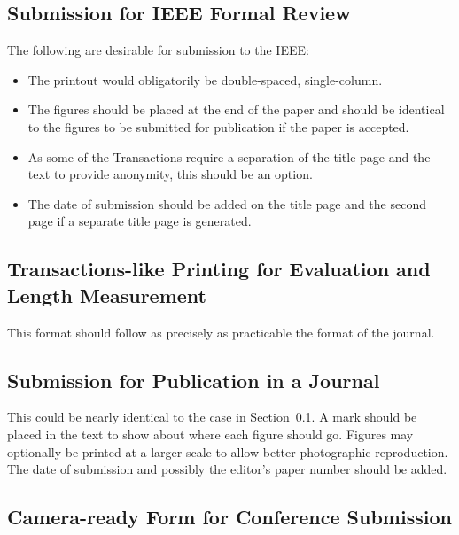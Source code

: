 \documentclass[%
	final,
	notitlepage,
	narroweqnarray,
	inline,
	twoside,
	]{ieee}
\begin{document}
\subsection{Submission for IEEE Formal Review}
\label{sec:review}

The following are desirable for submission to the IEEE:
\begin{itemize}
\item The printout would obligatorily be double-spaced, single-column.  
\item The figures should be placed at the end of the paper and should
      be identical to the figures to be submitted for publication if
      the paper is accepted.
\item As some of the Transactions require a separation of the title
      page and the text to provide anonymity, this should be an
      option. 
\item The date of submission should be added on the title page 
      and the second page if a separate title page is generated.
\end{itemize}

\subsection{Transactions-like Printing for Evaluation and Length
Measurement}

This format should follow as precisely as practicable the format of the 
journal.

\subsection{Submission for Publication in a Journal}

This could be nearly identical to the case in
Section~\ref{sec:review}.  A mark should be placed in the text to show
about where each figure should go.  Figures may optionally be printed
at a larger scale to allow better photographic reproduction.  The date
of submission and possibly the editor's paper number should be added.

\subsection{Camera-ready Form for Conference Submission}
\end{document}
